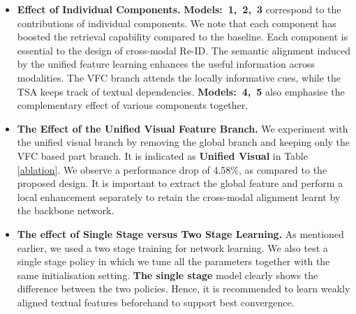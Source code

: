 \documentclass[letterpaper]{article} \usepackage{aaai22}  \usepackage{times}  \usepackage{helvet}  \usepackage{courier}  \usepackage[hyphens]{url}  \usepackage{graphicx} \urlstyle{rm} \def\UrlFont{\rm}  \usepackage{natbib}  \usepackage{caption} \DeclareCaptionStyle{ruled}{labelfont=normalfont,labelsep=colon,strut=off} \frenchspacing  \setlength{\pdfpagewidth}{8.5in}  \setlength{\pdfpageheight}{11in}  \usepackage{algorithm}
\begin{document}
\begin{itemize}
    \item \textbf{Effect of Individual Components.} \textbf{Models:\ 1,\ 2,\ 3} correspond to the contributions of individual components. We note that each component has boosted the retrieval capability compared to the baseline. Each component is essential to the design of cross-modal Re-ID. The semantic alignment induced by the unified feature learning enhances the useful information across modalities. The VFC branch attends the locally informative cues, while the TSA keeps track of textual dependencies. \textbf{Models:\ 4,\ 5} also emphasise the complementary effect of various components together.
    \item \textbf{The Effect of the Unified Visual Feature Branch.} 
    We experiment with the unified visual branch by removing the global branch and keeping only the VFC based part branch. It is indicated as \textbf{Unified Visual} in Table \ref{ablation}. We observe a performance drop of 4.58\%, as compared to the proposed design. It is important to extract the global feature and perform a local enhancement separately to retain the cross-modal alignment learnt by the backbone network.
    \item \textbf{The effect of Single Stage versus Two Stage  Learning.}
    As mentioned earlier, we used a two stage training for network learning. We also test a single stage policy in which we tune all the parameters together with the same initialisation setting. \textbf{The single stage} model clearly shows the difference between the two policies. Hence, it is recommended to learn weakly aligned textual features beforehand to support best convergence. 
\begin{table}[]
\center 
{}
\caption{Design parameters for the VFC branch}
\label{part-design}
\end{table}


\end{itemize}
\end{document}
